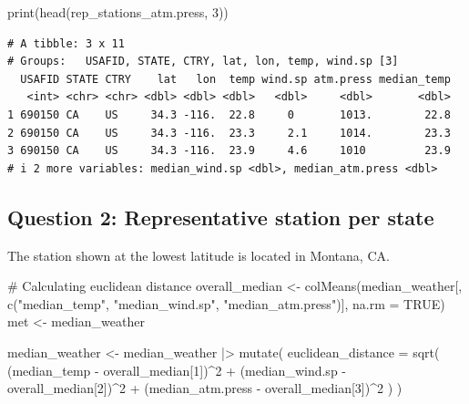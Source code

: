 \documentclass[
  letterpaper,
  DIV=11,
  numbers=noendperiod]{scrartcl}
\newenvironment{Shaded}{\begin{snugshade}}{\end{snugshade}}
\newcommand{\AttributeTok}[1]{\textcolor[rgb]{0.40,0.45,0.13}{#1}}
\newcommand{\CommentTok}[1]{\textcolor[rgb]{0.37,0.37,0.37}{#1}}
\newcommand{\ConstantTok}[1]{\textcolor[rgb]{0.56,0.35,0.01}{#1}}
\newcommand{\DecValTok}[1]{\textcolor[rgb]{0.68,0.00,0.00}{#1}}
\newcommand{\FunctionTok}[1]{\textcolor[rgb]{0.28,0.35,0.67}{#1}}
\newcommand{\NormalTok}[1]{\textcolor[rgb]{0.00,0.23,0.31}{#1}}
\newcommand{\OtherTok}[1]{\textcolor[rgb]{0.00,0.23,0.31}{#1}}
\newcommand{\SpecialCharTok}[1]{\textcolor[rgb]{0.37,0.37,0.37}{#1}}
\newcommand{\StringTok}[1]{\textcolor[rgb]{0.13,0.47,0.30}{#1}}
\begin{document}
\begin{Shaded}
\begin{Highlighting}[]
\FunctionTok{print}\NormalTok{(}\FunctionTok{head}\NormalTok{(rep\_stations\_atm.press, }\DecValTok{3}\NormalTok{))}
\end{Highlighting}
\end{Shaded}

\begin{verbatim}
# A tibble: 3 x 11
# Groups:   USAFID, STATE, CTRY, lat, lon, temp, wind.sp [3]
  USAFID STATE CTRY    lat   lon  temp wind.sp atm.press median_temp
   <int> <chr> <chr> <dbl> <dbl> <dbl>   <dbl>     <dbl>       <dbl>
1 690150 CA    US     34.3 -116.  22.8     0       1013.        22.8
2 690150 CA    US     34.3 -116.  23.3     2.1     1014.        23.3
3 690150 CA    US     34.3 -116.  23.9     4.6     1010         23.9
# i 2 more variables: median_wind.sp <dbl>, median_atm.press <dbl>
\end{verbatim}

\subsection{Question 2: Representative station per
state}\label{question-2-representative-station-per-state}

The station shown at the lowest latitude is located in Montana, CA.

\begin{Shaded}
\begin{Highlighting}[]
\CommentTok{\# Calculating euclidean distance}
\NormalTok{overall\_median }\OtherTok{\textless{}{-}} \FunctionTok{colMeans}\NormalTok{(median\_weather[, }\FunctionTok{c}\NormalTok{(}\StringTok{"median\_temp"}\NormalTok{, }\StringTok{"median\_wind.sp"}\NormalTok{, }\StringTok{"median\_atm.press"}\NormalTok{)], }\AttributeTok{na.rm =} \ConstantTok{TRUE}\NormalTok{)}
\NormalTok{met }\OtherTok{\textless{}{-}}\NormalTok{ median\_weather}
\end{Highlighting}
\end{Shaded}

\begin{Shaded}
\begin{Highlighting}[]
\NormalTok{median\_weather }\OtherTok{\textless{}{-}}\NormalTok{ median\_weather }\SpecialCharTok{|\textgreater{}}
  \FunctionTok{mutate}\NormalTok{(}
    \AttributeTok{euclidean\_distance =} \FunctionTok{sqrt}\NormalTok{(}
\NormalTok{      (median\_temp }\SpecialCharTok{{-}}\NormalTok{ overall\_median[}\DecValTok{1}\NormalTok{])}\SpecialCharTok{\^{}}\DecValTok{2} \SpecialCharTok{+} 
\NormalTok{      (median\_wind.sp }\SpecialCharTok{{-}}\NormalTok{ overall\_median[}\DecValTok{2}\NormalTok{])}\SpecialCharTok{\^{}}\DecValTok{2} \SpecialCharTok{+} 
\NormalTok{      (median\_atm.press }\SpecialCharTok{{-}}\NormalTok{ overall\_median[}\DecValTok{3}\NormalTok{])}\SpecialCharTok{\^{}}\DecValTok{2}
\NormalTok{    )}
\NormalTok{  )}
\end{Highlighting}
\end{Shaded}
\end{document}
